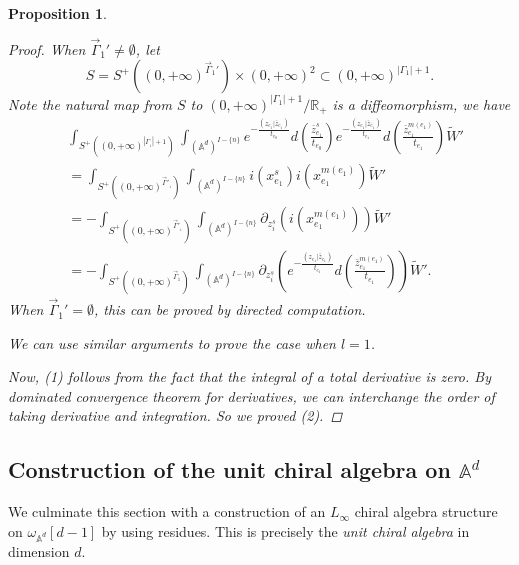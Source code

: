 \documentclass[11pt]{amsart}
\newtheorem{prop}[thm]{Proposition}
\theoremstyle{definition}
\theoremstyle{remark}
\numberwithin{equation}{section}
\begin{document}
\begin{prop}
\begin{proof}
        When $\vec{\Gamma}_{1}'\neq\emptyset$, let
        $$
        S=S^{+}((0,+\infty)^{\vec{\Gamma}_{1}'})\times(0,+\infty)^{2}\subset(0,+\infty)^{|\Gamma_{1}|+1}.
        $$
        Note the natural map from $S$ to $(0,+\infty)^{|\Gamma_{1}|+1}/\mathbb{R}_+$ is a diffeomorphism, we have
        \begin{align*}
            &\int_{S^{+}((0,+\infty)^{|\Gamma_{_{1}}|+1})}\int_{(\mathbb{A}^{d})^{ I-\{n\}}}
            e^{-\frac{(z_{e_{1}}| \bar{z}_{e_{1}})}{t_{e_{0}}}}d(\frac{\bar{z}_{e_{1}}^{s}}{t_{e_{0}}})e^{-\frac{(z_{e_{1}}| \bar{z}_{e_{1}})}{t_{e_{1}}}}d(\frac{\bar{z}_{e_{1}}^{m(e_{1})}}{t_{e_{1}}})\tilde{W}'\\
            &=
            \int_{S^{+}((0,+\infty)^{\vec{\Gamma}'_{_{1}}})}\int_{(\mathbb{A}^{d})^{ I-\{n\}}}i(x_{e_{1}}^{s})i(x_{e_{1}}^{m(e_{1})})\tilde{W}'\\
            &=
            -\int_{S^{+}((0,+\infty)^{\vec{\Gamma}'_{_{1}}})}\int_{(\mathbb{A}^{d})^{ I-\{n\}}}\partial_{z_{i}^{s}}(i(x_{e_{1}}^{m(e_{1})}))\tilde{W}'\\
            &=
            -\int_{S^{+}((0,+\infty)^{\vec{\Gamma}_{1}})}\int_{(\mathbb{A}^{d})^{ I-\{n\}}}\partial_{z_{i}^{s}}\left(e^{-\frac{(z_{e_{1}}| \bar{z}_{e_{1}})}{t_{e_{1}}}}d(\frac{\bar{z}_{e_{1}}^{m(e_{1})}}{t_{e_{1}}})\right)\tilde{W}'.
        \end{align*}
        When $\vec{\Gamma}_{1}'=\emptyset$, this can be proved by directed computation.

        We can use similar arguments to prove the case when $l=1$.

        Now, (1) follows from the fact that the integral of a total derivative is zero. By dominated convergence theorem for derivatives, we can interchange the order of taking derivative and integration. So we proved (2).
    \end{proof}
\end{prop}
\subsection{Construction of the unit chiral algebra on $\mathbb{A}^d$} \label{s:unit}

We culminate this section with a construction of an $L_{\infty}$ chiral algebra structure on $\omega_{\mathbb{A}^{d}}[d-1]$ by using residues.
This is precisely the \textit{unit chiral algebra} in dimension $d$.
\end{document}
